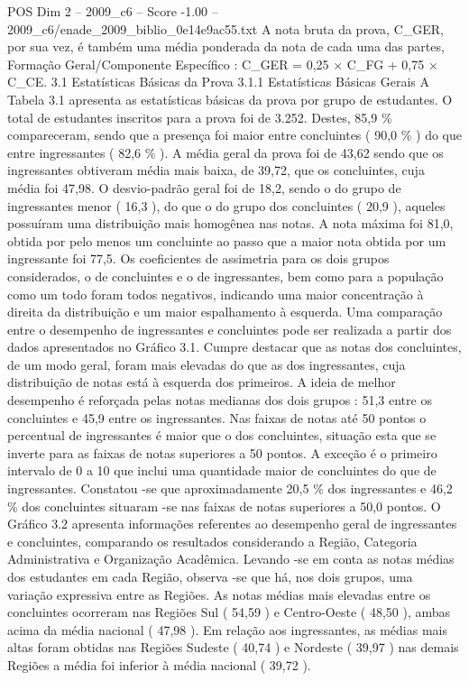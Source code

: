 \begin{textsample}{POS Dim 2 – 2009\_c6 – Score -1.00 – 2009\_c6/enade\_2009\_biblio\_0e14e9ac55.txt}
A nota bruta da prova, C\_GER, por sua vez, é também uma média ponderada da nota de cada uma das partes, Formação Geral/Componente Específico : C\_GER = 0,25 × C\_FG + 0,75 × C\_CE. 3.1 Estatísticas Básicas da Prova 3.1.1 Estatísticas Básicas Gerais A Tabela 3.1 apresenta as estatísticas básicas da prova por grupo de estudantes.
O total de estudantes inscritos para a prova foi de 3.252.
Destes, 85,9 \% compareceram, sendo que a presença foi maior entre concluintes ( 90,0 \% ) do que entre ingressantes ( 82,6 \% ).
A média geral da prova foi de 43,62 sendo que os ingressantes obtiveram média mais baixa, de 39,72, que os concluintes, cuja média foi 47,98.
O desvio-padrão geral foi de 18,2, sendo o do grupo de ingressantes menor ( 16,3 ), do que o do grupo dos concluintes ( 20,9 ), aqueles possuíram uma distribuição mais homogênea nas notas.
A nota máxima foi 81,0, obtida por pelo menos um concluinte ao passo que a maior nota obtida por um ingressante foi 77,5.
Os coeficientes de assimetria para os dois grupos considerados, o de concluintes e o de ingressantes, bem como para a população como um todo foram todos negativos, indicando uma maior concentração à direita da distribuição e um maior espalhamento à esquerda.
Uma comparação entre o desempenho de ingressantes e concluintes pode ser realizada a partir dos dados apresentados no Gráfico 3.1.
Cumpre destacar que as notas dos concluintes, de um modo geral, foram mais elevadas do que as dos ingressantes, cuja distribuição de notas está à esquerda dos primeiros.
A ideia de melhor desempenho é reforçada pelas notas medianas dos dois grupos : 51,3 entre os concluintes e 45,9 entre os ingressantes.
Nas faixas de notas até 50 pontos o percentual de ingressantes é maior que o dos concluintes, situação esta que se inverte para as faixas de notas superiores a 50 pontos.
A exceção é o primeiro intervalo de 0 a 10 que inclui uma quantidade maior de concluintes do que de ingressantes.
Constatou -se que aproximadamente 20,5 \% dos ingressantes e 46,2 \% dos concluintes situaram -se nas faixas de notas superiores a 50,0 pontos.
O Gráfico 3.2 apresenta informações referentes ao desempenho geral de ingressantes e concluintes, comparando os resultados considerando a Região, Categoria Administrativa e Organização Acadêmica.
Levando -se em conta as notas médias dos estudantes em cada Região, observa -se que há, nos dois grupos, uma variação expressiva entre as Regiões.
As notas médias mais elevadas entre os concluintes ocorreram nas Regiões Sul ( 54,59 ) e Centro-Oeste ( 48,50 ), ambas acima da média nacional ( 47,98 ).
Em relação aos ingressantes, as médias mais altas foram obtidas nas Regiões Sudeste ( 40,74 ) e Nordeste ( 39,97 ) nas demais Regiões a média foi inferior à média nacional ( 39,72 ).

\end{textsample}
